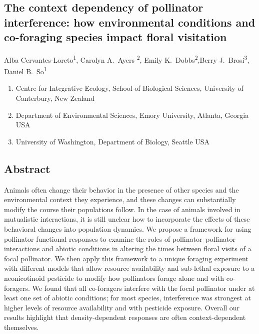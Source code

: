 \begin{refsection}
\chapter{The context dependency of pollinator interference: how environmental conditions and co-foraging species impact floral visitation} %
\label{Bee_foraging}

\noindent Alba Cervantes-Loreto\textsuperscript{1}, Carolyn A.\ Ayers \textsuperscript{2}, Emily K.\ Dobbs\textsuperscript{2},Berry J.\ Brosi\textsuperscript{3}, Daniel B.\ So\textsuperscript{1}

\begin{enumerate}
    \item Centre for Integrative Ecology, School of Biological Sciences, University of Canterbury, New Zealand
    \item Department of Environmental Sciences, Emory University, Atlanta, Georgia USA
    \item University of Washington, Department of Biology, Seattle USA
\end{enumerate}

\section*{Abstract}
Animals often change their behavior in the presence of other species and the environmental context they experience, and these changes can substantially modify the course their populations follow. In the case of animals involved in mutualistic interactions, it is still unclear how to incorporate the effects of these behavioral changes into population dynamics. We propose a framework for using pollinator functional responses to examine the roles of pollinator--pollinator interactions and abiotic conditions in altering the times between floral visits of a focal pollinator. We then apply this framework to a unique foraging experiment with different models that allow resource availability and sub-lethal exposure to a neonicotinoid pesticide to modify how pollinators forage alone and with co-foragers. We found that all co-foragers interfere with the focal pollinator under at least one set of abiotic conditions; for most species, interference was strongest at higher levels of resource availability and with pesticide exposure. Overall our results highlight that density-dependent responses are often context-dependent themselves.


\end{refsection}

